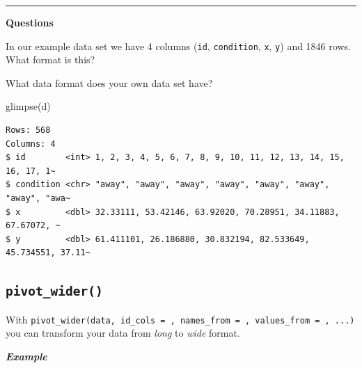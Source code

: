 \documentclass[
  letterpaper,
  DIV=11,
  numbers=noendperiod,
  oneside]{scrreprt}
\newenvironment{Shaded}{\begin{snugshade}}{\end{snugshade}}
\newcommand{\FunctionTok}[1]{\textcolor[rgb]{0.28,0.35,0.67}{#1}}
\newcommand{\NormalTok}[1]{\textcolor[rgb]{0.00,0.23,0.31}{#1}}
\begin{document}
\begin{center}\rule{0.5\linewidth}{0.5pt}\end{center}

\begin{tcolorbox}[enhanced jigsaw, colframe=quarto-callout-tip-color-frame, bottomrule=.15mm, left=2mm, arc=.35mm, toprule=.15mm, opacityback=0, colback=white, rightrule=.15mm, breakable, leftrule=.75mm]
\begin{minipage}[t]{5.5mm}
\textcolor{quarto-callout-tip-color}{\faLightbulb}
\end{minipage}%
\begin{minipage}[t]{\textwidth - 5.5mm}

\textbf{Questions}\vspace{2mm}

In our example data set we have 4 columns (\texttt{id},
\texttt{condition}, \texttt{x}, \texttt{y}) and 1846 rows. What format
is this?

What data format does your own data set have?

\end{minipage}%
\end{tcolorbox}

\begin{Shaded}
\begin{Highlighting}[]
\FunctionTok{glimpse}\NormalTok{(d)}
\end{Highlighting}
\end{Shaded}

\begin{verbatim}
Rows: 568
Columns: 4
$ id        <int> 1, 2, 3, 4, 5, 6, 7, 8, 9, 10, 11, 12, 13, 14, 15, 16, 17, 1~
$ condition <chr> "away", "away", "away", "away", "away", "away", "away", "awa~
$ x         <dbl> 32.33111, 53.42146, 63.92020, 70.28951, 34.11883, 67.67072, ~
$ y         <dbl> 61.411101, 26.186880, 30.832194, 82.533649, 45.734551, 37.11~
\end{verbatim}

\hypertarget{pivot_wider}{%
\subsection{\texorpdfstring{\texttt{pivot\_wider()}}{pivot\_wider()}}\label{pivot_wider}}

With
\texttt{pivot\_wider(data,\ id\_cols\ =\ ,\ names\_from\ =\ ,\ values\_from\ =\ ,\ ...)}
you can transform your data from \emph{long} to \emph{wide} format.

\textbf{\emph{Example}}
\end{document}
